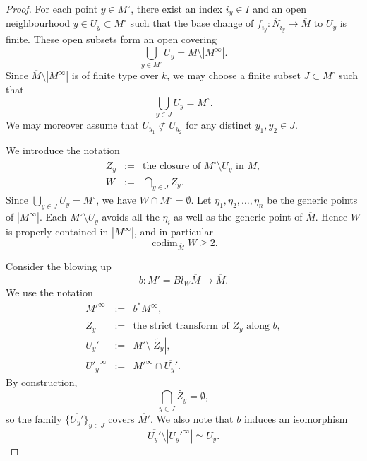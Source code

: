 \documentclass[11pt]{amsart}
\newcommand{\codim}{{\operatorname{codim}}}
\newcommand{\ol}{\overline}
\def\Minf{M^{\infty}}
\theoremstyle{definition}
\theoremstyle{remark}
\numberwithin{equation}{section}
\begin{document}
\begin{proof}
For each point $y \in  M^\circ$, there exist an index ${i_y}\in I$ and an open neighbourhood $y \in U_y \subset  M^\circ$ such that the base change of $f_{i_y}:\ol{N}_{i_y} \to \ol{M}$ to $U_y$ is finite. These open subsets form an open covering
\[
\bigcup_{y \in M^\circ} U_y=\ol{M}\setminus |M^\infty|.
\]
Since $\ol{M}\setminus |M^\infty|$ is of finite type over $k$, we may choose a finite subset $J \subset  M^\circ$ such that
\[
\bigcup_{y \in J} U_y= M^\circ.
\]
We may moreover assume that $U_{y_1}\not\subset U_{y_2}$ for any distinct $y_1,y_2\in J$.

We introduce the notation
\begin{eqnarray*}
Z_y&:=&\text{the closure of }M^\circ \setminus U_y \text{ in }\ol{M},\\
W&:=&\bigcap_{y \in J} Z_y.
\end{eqnarray*}
Since $\bigcup_{y\in J}U_y=M^\circ$, we have $W \cap M^\circ=\emptyset$. Let $\eta_1,\eta_2,\dots,\eta_n$ be the generic points of $|\Minf|$. Each $M^\circ\setminus U_y$ avoids all the $\eta_i$ as well as the generic point of $\ol{M}$. Hence $W$ is properly contained in $|M^\infty|$, and in particular
\[
\codim_{\ol{M}}W \geq 2.
\]

Consider the blowing up
\[
b:\ol{M'}=Bl_{W}\ol{M} \to \ol{M}.
\]
We use the notation
\begin{eqnarray*}
{M'}^\infty&:=& b^*M^\infty,\\
\widetilde{Z_y}&:=&\text{the strict transform of }Z_y\text{ along }b,\\
\ol{U_y'}&:=&\ol{M'}\setminus |\widetilde{Z_y}|,\\
{U'_y}^\infty&:=&{M'}^\infty \cap \ol{U_y'}.
\end{eqnarray*}
By construction,
\[
\bigcap_{y\in J}\widetilde{Z_y}=\emptyset,
\]
so the family $\{\ol{U_y'}\}_{y\in J}$ covers $\ol{M'}$. We also note that $b$ induces an isomorphism
\[
\ol{U_y'}\setminus |{U_y'}^\infty| \simeq U_y.
\]


\end{proof}
\end{document}
